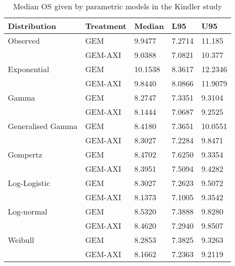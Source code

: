 \begin{table}
    \center
    \begin{tabular}{lllll}
    \hline
    Distribution      & Treatment & Median  & L95    & U95     \\ \hline
    Observed          & GEM       & 9.9477  & 7.2714 & 11.185  \\
                      & GEM-AXI   & 9.0388  & 7.0821 & 10.377  \\ \hline
    Exponential       & GEM       & 10.1538 & 8.3617 & 12.2346 \\
                      & GEM-AXI   & 9.8440  & 8.0866 & 11.9079 \\
    Gamma             & GEM       & 8.2747  & 7.3351 & 9.3104  \\
                      & GEM-AXI   & 8.1444  & 7.0687 & 9.2525  \\
    Generalised Gamma & GEM       & 8.4180  & 7.3651 & 10.0551 \\
                      & GEM-AXI   & 8.3027  & 7.2284 & 9.8471  \\
    Gompertz          & GEM       & 8.4702  & 7.6250 & 9.3354  \\
                      & GEM-AXI   & 8.3951  & 7.5094 & 9.4282  \\
    Log-Logistic      & GEM       & 8.3027  & 7.2623 & 9.5072  \\
                      & GEM-AXI   & 8.1373  & 7.1005 & 9.3542  \\
    Log-normal        & GEM       & 8.5320  & 7.3888 & 9.8280  \\
                      & GEM-AXI   & 8.4620  & 7.2940 & 9.8507  \\
    Weibull           & GEM       & 8.2853  & 7.3825 & 9.3263  \\
                      & GEM-AXI   & 8.1662  & 7.2363 & 9.2119  \\ \hline
    \end{tabular}
    \caption{Median OS given by parametric models in the Kindler study}
    \label{kindlerModelMedians}
\end{table}

